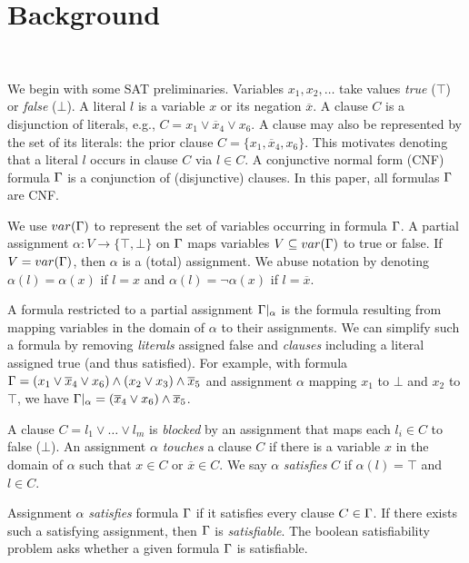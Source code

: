 \section{Background}~\label{sec:background}

We begin with some SAT preliminaries. Variables $x_1, x_2, \dots$ take values
\emph{true} ($\top$) or \emph{false} ($\bot$). A literal $l$ is a variable
$x$ or its negation $\overline{x}$. A clause $C$ is a disjunction of literals,
e.g., $C = x_1 \lor \overline{x}_4 \lor x_6$. A clause may also be represented by the set of its literals:
the prior clause $C = \{x_1, \overline{x}_4, x_6\}$. This motivates denoting that a literal
$l$ occurs in clause $C$ via $l \in C$. A conjunctive normal form (CNF)
formula $\Gamma$ is a conjunction of (disjunctive) clauses. In this paper,
all formulas $\Gamma$ are CNF.

We use $var(\Gamma)$ to represent the set of variables occurring in formula $\Gamma$.
A partial assignment $\alpha : V \rightarrow \{\top, \bot\}$ on $\Gamma$
maps variables $V \subseteq var(\Gamma)$ to true or false. If $V
= var(\Gamma)$, then $\alpha$ is a (total) assignment. We abuse notation by
denoting $\alpha(l) = \alpha(x)$ if $l = x$ and $\alpha(l) = \neg \alpha(x)$ if
$l = \overline{x}$.

A formula restricted to a partial assignment $\Gamma|_\alpha$ is the formula resulting from
mapping variables in the domain of $\alpha$ to their assignments. We can
simplify such a formula by removing \emph{literals} assigned false and
\emph{clauses} including a literal assigned true (and thus satisfied).
For example, with formula $\Gamma =
(x_1 \lor \overline{x}_4 \lor x_6) \land (x_2 \lor x_3) \land \overline{x}_5$
and assignment $\alpha$ mapping $x_1$ to $\bot$ and $x_2$ to $\top$,
we have $\Gamma|_\alpha = (\overline{x}_4 \lor x_6) \land \overline{x}_5$.

A clause $C = l_1 \lor \dots \lor l_m$ is \emph{blocked} by an assignment
that maps each $l_i \in C$ to false ($\bot$). An assignment $\alpha$
\emph{touches} a clause $C$ if there is a variable $x$ in the domain of $\alpha$
such that $x \in C$ or $\overline{x} \in C$. We say $\alpha$ \emph{satisfies}
$C$ if $\alpha(l) = \top$ and $l \in C$.

Assignment $\alpha$ \emph{satisfies} formula $\Gamma$ if it satisfies every
clause $C \in \Gamma$. If there exists such a satisfying assignment, then $\Gamma$ is
\emph{satisfiable}. The boolean satisfiability problem asks whether a given
formula $\Gamma$ is satisfiable.


